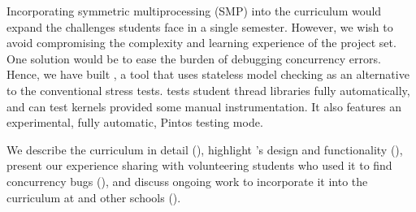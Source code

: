 Incorporating symmetric multiprocessing (SMP) into the \fourten curriculum would expand the challenges students face in a single semester.
However, we wish to avoid compromising the complexity
and learning experience of the project set.
One solution would be to ease the burden of debugging concurrency errors.
Hence, we have built \landslide%
, a tool that uses stateless model checking \cite{verisoft,dpor,chess}
as an alternative to the conventional stress tests.
\landslide tests student thread libraries fully automatically, and can test kernels provided some manual instrumentation.
It also features an experimental, fully automatic, Pintos testing mode.

We describe the \fourten curriculum in detail (\sect{\ref{sec:410}}),
highlight \landslide's design and functionality (\sect{\ref{sec:landslide}}),
present our experience sharing \landslide with volunteering students who used it to find concurrency bugs (\sect{\ref{sec:eval}}),
and discuss ongoing work to incorporate it into the curriculum at \cmu and other schools (\sect{\ref{sec:warpzone}}).

